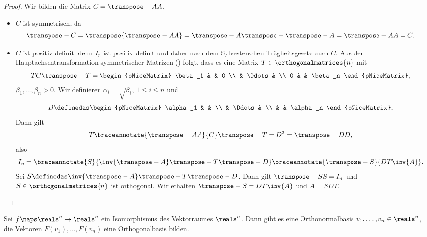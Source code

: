 \begin{proof}
  Wir bilden die Matrix \( C=\transpose-{A}A \).
  \begin{itemize}
    \item \( C \) ist symmetrisch, da
    \begin{equation*}
      \transpose-{C}=\transpose{\transpose-{A}A}=\transpose-{A}\transpose-{\transpose-{A}}=\transpose-{A}A=C.
    \end{equation*}
    \item \( C \) ist positiv definit, denn \( I_n \) ist positiv definit und daher nach dem Sylvesterschen Trägheitsgesetz auch \( C \). Aus der Hauptachsentransformation symmetrischer Matrizen () folgt, dass es eine Matrix \( T\in \orthogonalmatrices{n} \) mit
    \begin{equation*}
      TC\transpose-{T}=\begin{pNiceMatrix}
        \beta_1 &  & 0 \\
         & \Ddots &  \\
        0 &  & \beta_n
      \end{pNiceMatrix},
    \end{equation*}
    \( \beta_1,\dotsc,\beta_n>0 \). Wir definieren \( \alpha_i=\sqrt{\beta_i} \), \( 1\leq i\leq n \) und 
    \begin{equation*}
      D\definedas \begin{pNiceMatrix} \alpha_1 &  &  \\  & \Ddots &  \\  &  & \alpha_n \end{pNiceMatrix},
    \end{equation*}
    Dann gilt
    \begin{equation*}
      T\braceannotate{\transpose-{A}A}{C}\transpose-{T}=D^2=\transpose-{D}D,
    \end{equation*}
    also
    \begin{equation*}
      I_n=\braceannotate{S}{\inv{\transpose-{A}}\transpose-{T}\transpose-{D}}\braceannotate{\transpose-{S}}{DT\inv{A}}.
    \end{equation*}
    Sei \( S\definedas \inv{\transpose-{A}}\transpose-{T}\transpose-{D} \). Dann gilt \( \transpose-{S}S=I_n \) und \( S\in \orthogonalmatrices{n} \) ist orthogonal. Wir erhalten \( \transpose-{S}=DT\inv{A} \) und \( A=SDT \).
  \end{itemize}
\end{proof}
\begin{korollar*}
  Sei \( f\maps \reals^n\to \reals^n \) ein Isomorphismus des Vektorraumes \( \reals^n \). Dann gibt es eine Orthonormalbasis \( v_1,\dotsc, v_n\in \reals^n \), \sd die Vektoren \( F(v_1),\dotsc,F(v_n) \) eine Orthogonalbasis bilden.
\end{korollar*}
